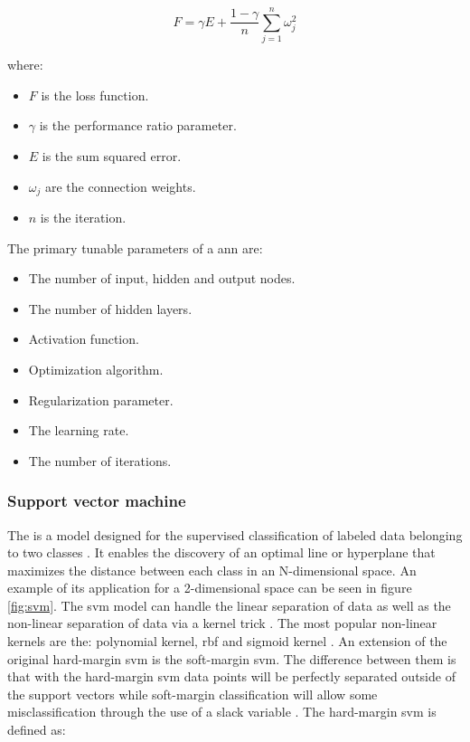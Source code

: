 \begin{itemize}
        $$F = \gamma E + \frac{1 - \gamma}{n} \sum_{j=1}^{n}\omega_{j}^2$$

        where:
        \begin{itemize}
            \item $F$ is the loss function.
            \item $\gamma$ is the performance ratio parameter.
            \item $E$ is the sum squared error.
            \item $\omega_{j}$ are the connection weights.
            \item $n$ is the iteration.
        \end{itemize}
\end{itemize}

The primary tunable parameters of a \gls{ann} are:
\begin{itemize}
    \item The number of input, hidden and output nodes.
    \item The number of hidden layers.
    \item Activation function.
    \item Optimization algorithm.
    \item Regularization parameter.
    \item The learning rate.
    \item The number of iterations.
\end{itemize}

\subsubsection{Support vector machine}\label{Support vector machine}

The  is a model designed for the supervised classification of labeled data belonging to two classes \cite{vapnik-svm}. It enables the discovery of an optimal line or hyperplane that maximizes the distance between each class in an N-dimensional space. An example of its application for a 2-dimensional space can be seen in figure \ref{fig:svm}. The \gls{svm} model can handle the linear separation of data as well as the non-linear separation of data via a kernel trick \cite{non-linear-svm}. The most popular non-linear kernels are the: polynomial kernel, \gls{rbf} and sigmoid kernel \cite{ibm-svm}. An extension of the original hard-margin \gls{svm} is the soft-margin \gls{svm}. The difference between them is that with the hard-margin \gls{svm} data points will be perfectly separated outside of the support vectors while soft-margin classification will allow some misclassification through the use of a slack variable \cite{vapnik-svm}.
The hard-margin \gls{svm} is defined as:

